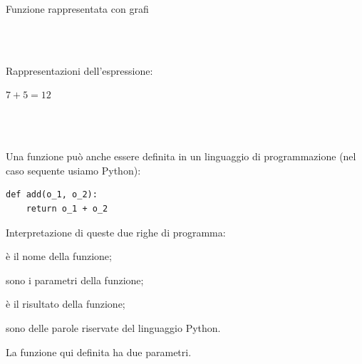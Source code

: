 \vspace{.5em}
\begin{minipage}[t]{.48\textwidth}
\begin{center}
Funzione rappresentata con grafi\\[1em]
\begin{inaccessibleblock}
\\[0.5em]
\\[.5em]
\end{inaccessibleblock}

\begin{inaccessibleblock}
\end{inaccessibleblock}
\end{center}
\end{minipage}
\hfill
\begin{minipage}[t]{.48\textwidth}
\begin{center}
Rappresentazioni dell'espressione:

\(7 + 5 = 12\)

\begin{inaccessibleblock}
\\[0.5em]
\\[0.5em]
\end{inaccessibleblock}

\begin{inaccessibleblock}
\end{inaccessibleblock}
\end{center}
\end{minipage}
\vspace{1em}

Una funzione può anche essere definita in un linguaggio di programmazione 
(nel caso sequente usiamo Python):
\begin{lstlisting}
def add(o_1, o_2):
    return o_1 + o_2
\end{lstlisting}
Interpretazione di queste due righe di programma:
\begin{description} [nosep]
\item [\textbf{``add''}] è il nome della funzione;
\item [\textbf{``o\_1'' e ``o\_2''}] sono i parametri della funzione; 
\item [\textbf{l'espressione che segue la parola ``return''}] è il risultato
della funzione; 
\item [\textbf{``def'' e ``return''}] sono delle parole riservate del 
linguaggio
Python.
\end{description}
La funzione qui definita ha due parametri.

